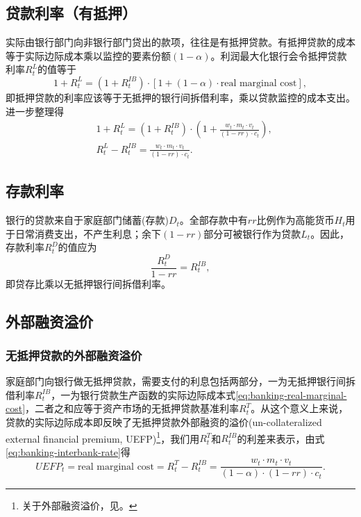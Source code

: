 \subsection{贷款利率（有抵押）}
实际由银行部门向非银行部门贷出的款项，往往是有抵押贷款。有抵押贷款的成本等于实际边际成本乘以监控的要素份额$(1-\alpha)$。利润最大化银行会令抵押贷款利率$R_t^L$的值等于
\begin{equation*}
  1+R_t^{L} = \left( 1+R_t^{IB} \right) \cdot \left[ 1+ (1-\alpha) \cdot \text{real marginal cost} \right],
\end{equation*}
即抵押贷款的利率应该等于无抵押的银行间拆借利率，乘以贷款监控的成本支出。进一步整理得
\begin{equation}
  \label{eq:banking-loan-rate}
  \begin{split}
  & 1+R_t^{L} = \left( 1+R_t^{IB} \right) \cdot \left( 1+ \frac{w_t \cdot m_t \cdot v_t}{\left( 1 - rr \right) \cdot c_t}\right), \\
  & R_t^L - R_t^{IB} = \frac{w_t \cdot m_t \cdot v_t}{\left( 1 - rr \right) \cdot c_t} .
  \end{split}
\end{equation}

\subsection{存款利率}
银行的贷款来自于家庭部门储蓄(存款)$D_t$。全部存款中有$rr$比例作为高能货币$H_t$用于日常消费支出，不产生利息；余下$(1-rr)$部分可被银行作为贷款$L_t$。因此，存款利率$R_t^{D}$的值应为
\begin{equation}
  \label{eq:banking-deposit-rate}
    \frac{R_t^{D}}{1-rr} = R_t^{IB},
\end{equation}
即贷存比乘以无抵押银行间拆借利率。

\subsection{外部融资溢价}

\subsubsection{无抵押贷款的外部融资溢价}
家庭部门向银行做无抵押贷款，需要支付的利息包括两部分，一为无抵押银行间拆借利率$R_t^{IB}$，一为银行贷款生产函数的实际边际成本式\eqref{eq:banking-real-marginal-cost}，二者之和应等于资产市场的无抵押贷款基准利率$R_t^T$。从这个意义上来说，贷款的实际边际成本即反映了无抵押贷款外部融资的溢价(un-collateralized external financial premium, UEFP)\footnote{关于外部融资溢价，见\cite{Bernanke1999}。}，我们用$R_t^T$和$R_t^{IB}$的利差来表示，由式\eqref{eq:banking-interbank-rate}得
\begin{equation}
  \label{eq:un-collateralized-external-financial-premium}
  UEFP_t = \text{real marginal cost} = R_t^T - R_t^{IB} = \frac{w_t \cdot m_t \cdot v_t }{(1-\alpha) \cdot (1-rr) \cdot c_t}.
\end{equation}


